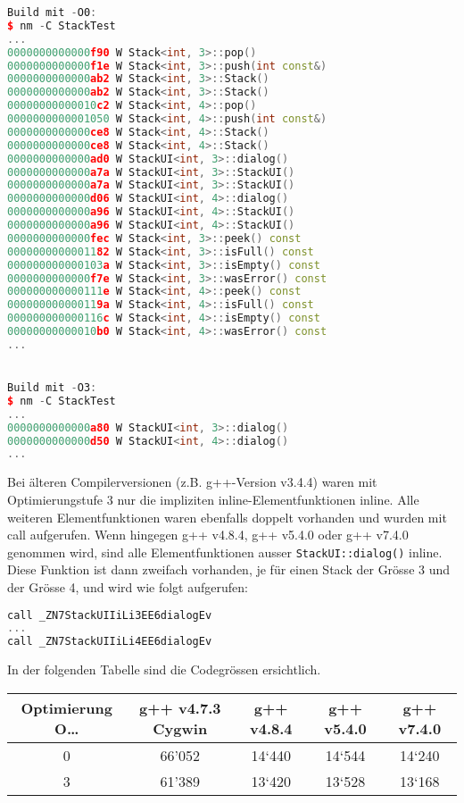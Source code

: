 \begin{enumerate}
\begin{lstlisting}[language=C++, style=C++, multicols=2]
Build mit -O0:
$ nm -C StackTest
...
0000000000000f90 W Stack<int, 3>::pop()
0000000000000f1e W Stack<int, 3>::push(int const&)
0000000000000ab2 W Stack<int, 3>::Stack()
0000000000000ab2 W Stack<int, 3>::Stack()
00000000000010c2 W Stack<int, 4>::pop()
0000000000001050 W Stack<int, 4>::push(int const&)
0000000000000ce8 W Stack<int, 4>::Stack()
0000000000000ce8 W Stack<int, 4>::Stack()
0000000000000ad0 W StackUI<int, 3>::dialog()
0000000000000a7a W StackUI<int, 3>::StackUI()
0000000000000a7a W StackUI<int, 3>::StackUI()
0000000000000d06 W StackUI<int, 4>::dialog()
0000000000000a96 W StackUI<int, 4>::StackUI()
0000000000000a96 W StackUI<int, 4>::StackUI()
0000000000000fec W Stack<int, 3>::peek() const
0000000000001182 W Stack<int, 3>::isFull() const
000000000000103a W Stack<int, 3>::isEmpty() const
0000000000000f7e W Stack<int, 3>::wasError() const
000000000000111e W Stack<int, 4>::peek() const
000000000000119a W Stack<int, 4>::isFull() const
000000000000116c W Stack<int, 4>::isEmpty() const
00000000000010b0 W Stack<int, 4>::wasError() const
...


Build mit -O3:
$ nm -C StackTest
...
0000000000000a80 W StackUI<int, 3>::dialog()
0000000000000d50 W StackUI<int, 4>::dialog()
...
\end{lstlisting}
  Bei älteren Compilerversionen (z.B. g++-Version v3.4.4) waren mit Optimierungstufe 3 nur die impliziten inline-Elementfunktionen inline. Alle weiteren Elementfunktionen waren ebenfalls doppelt vorhanden und wurden mit call aufgerufen. Wenn hingegen g++ v4.8.4, g++ v5.4.0 oder g++ v7.4.0 genommen wird, sind alle Elementfunktionen ausser \texttt{StackUI::dialog()} inline. Diese Funktion ist dann zweifach vorhanden, je für einen Stack der Grösse 3 und der Grösse 4, und wird wie folgt aufgerufen:

\begin{lstlisting}[language=C++, style=C++]
call _ZN7StackUIIiLi3EE6dialogEv
...
call _ZN7StackUIIiLi4EE6dialogEv
\end{lstlisting}
In der folgenden Tabelle sind die Codegrössen ersichtlich.
\begin{center}
  \begin{tabular}{c c c c c}
    \hline
    \hline
    Optimierung O… & g++ v4.7.3 Cygwin & g++ v4.8.4  & g++ v5.4.0 & g++ v7.4.0 \\
    \hline
    0 &
66'052&
14‘440&
14‘544&
14‘240\\
3&
61'389&
13‘420&
13‘528&
13‘168\\
    \hline
    \hline
  \end{tabular}
\end{center}
\end{enumerate}

